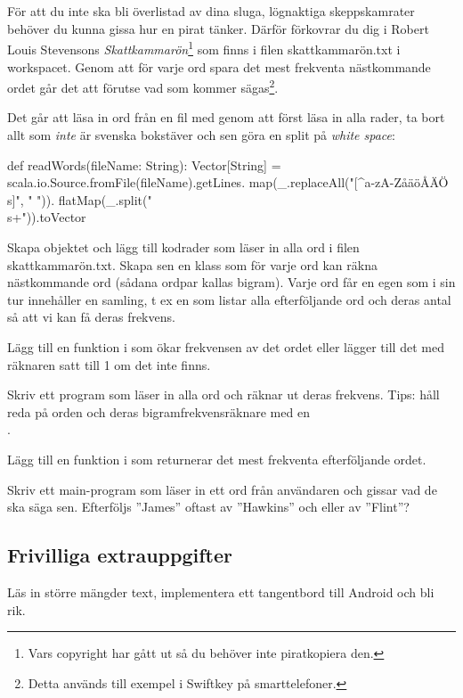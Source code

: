 \\
\noindent \\
För att du inte ska bli överlistad av dina sluga, lögnaktiga skeppskamrater behöver du kunna gissa hur en pirat tänker. Därför förkovrar du dig i Robert Louis Stevensons \emph{Skattkammarön}\footnote{Vars copyright har gått ut så du behöver inte piratkopiera den.} som finns i filen skattkammarön.txt i workspacet.  Genom att för varje ord spara det mest frekventa nästkommande ordet går det att förutse vad som kommer sägas\footnote{Detta används till exempel i Swiftkey på smarttelefoner.}. 

\Subtask Det går att läsa in ord från en fil med  genom att först läsa in alla rader, ta bort allt som {\em inte} är svenska bokstäver och sen göra en split på \emph{white space}: 
\begin{Code}
def readWords(fileName: String): Vector[String] = {
	   scala.io.Source.fromFile(fileName).getLines.
	   map(_.replaceAll("[^a-zA-ZåäöÅÄÖ\\s]", " ")).
	   flatMap(_.split("\\s+")).toVector
	}
\end{Code}

Skapa objektet  och lägg till kodrader som läser in alla ord i filen skattkammarön.txt. Skapa sen en klass  som för varje ord kan räkna nästkommande ord (sådana ordpar kallas bigram). Varje ord får en egen  som i sin tur innehåller en samling, t ex en  som listar alla efterföljande ord och deras antal så att vi kan få deras frekvens.

\Subtask Lägg till en funktion  i  som ökar frekvensen av det ordet  eller lägger till det med räknaren satt till 1 om det inte finns. 

\Subtask Skriv ett program som läser in alla ord och räknar ut deras frekvens. Tips: håll reda på orden och deras bigramfrekvensräknare med en \\
.

\Subtask Lägg till en funktion  i  som returnerar det mest frekventa efterföljande ordet. 

\Subtask Skriv ett main-program som läser in ett ord från användaren och gissar vad de ska säga sen. Efterföljs ''James'' oftast av ''Hawkins'' och eller av ''Flint''?




\subsection{Frivilliga extrauppgifter}

\Task Läs in större mängder text, implementera ett tangentbord till Android och bli rik.


    